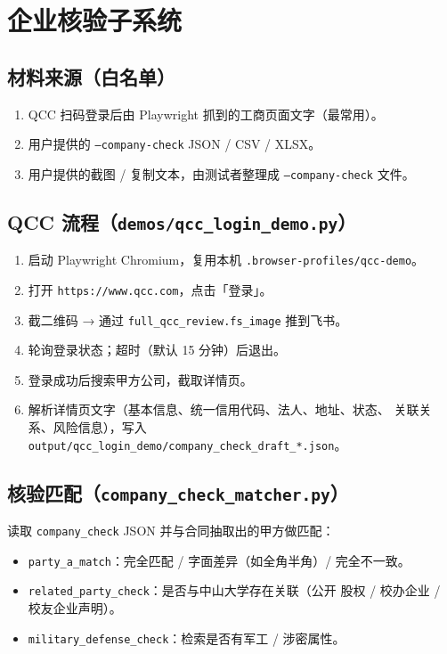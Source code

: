 \documentclass[11pt,a4paper]{article}
\begin{document}
\section{企业核验子系统}

\subsection{材料来源（白名单）}

\begin{enumerate}[leftmargin=1.4em,itemsep=1pt]
  \item QCC 扫码登录后由 Playwright 抓到的工商页面文字（最常用）。
  \item 用户提供的 \texttt{--company-check} JSON / CSV / XLSX。
  \item 用户提供的截图 / 复制文本，由测试者整理成
    \texttt{--company-check} 文件。
\end{enumerate}

\subsection{QCC 流程（\texttt{demos/qcc\_login\_demo.py}）}

\begin{enumerate}[leftmargin=1.4em,itemsep=1pt]
  \item 启动 Playwright Chromium，复用本机 \texttt{.browser-profiles/qcc-demo}。
  \item 打开 \texttt{https://www.qcc.com}，点击「登录」。
  \item 截二维码 → 通过 \texttt{full\_qcc\_review.fs\_image} 推到飞书。
  \item 轮询登录状态；超时（默认 15 分钟）后退出。
  \item 登录成功后搜索甲方公司，截取详情页。
  \item 解析详情页文字（基本信息、统一信用代码、法人、地址、状态、
    关联关系、风险信息），写入
    \texttt{output/qcc\_login\_demo/company\_check\_draft\_*.json}。
\end{enumerate}

\subsection{核验匹配（\texttt{company\_check\_matcher.py}）}

读取 \texttt{company\_check} JSON 并与合同抽取出的甲方做匹配：

\begin{itemize}[leftmargin=1.4em,itemsep=1pt]
  \item \texttt{party\_a\_match}：完全匹配 / 字面差异（如全角半角）/
    完全不一致。
  \item \texttt{related\_party\_check}：是否与中山大学存在关联（公开
    股权 / 校办企业 / 校友企业声明）。
  \item \texttt{military\_defense\_check}：检索是否有军工 / 涉密属性。
\end{itemize}
\end{document}
